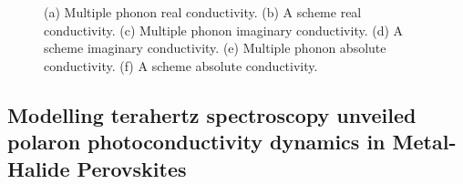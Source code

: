 \begin{figure}
{\begin{subfigure}[b]{.58\textwidth}
\end{subfigure}%
}
\caption{(a) Multiple phonon real conductivity. (b) A scheme real conductivity. (c) Multiple phonon imaginary conductivity. (d) A scheme imaginary conductivity. (e) Multiple phonon absolute conductivity. (f) A scheme absolute conductivity.}
\end{figure}

\subsection{Modelling terahertz spectroscopy unveiled polaron photoconductivity dynamics in Metal-Halide Perovskites}

\begin{figure}[t]
\end{figure}

